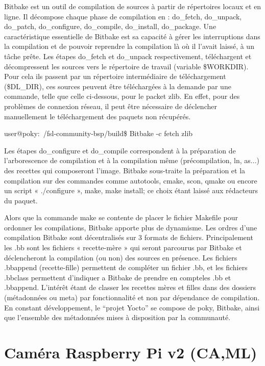Bitbake est un outil de compilation de sources à partir de répertoires locaux et en ligne. Il
décompose chaque phase de compilation en : do\_fetch, do\_unpack, do\_patch,
do\_configure, do\_compile, do\_install, do\_package. Une caractéristique essentielle de
Bitbake est sa capacité à gérer les interruptions dans la compilation et de pouvoir
reprendre la compilation là où il l'avait laissé, à un tâche prête.
Les étapes do\_fetch et do\_unpack respectivement, téléchargent et décompressent les
sources vers le répertoire de travail (variable \$WORKDIR). Pour cela ils passent par un
répertoire intermédiaire de téléchargement (\$DL\_DIR), ces sources peuvent être
téléchargées à la demande par une commande, telle que celle ci-dessous, pour le packet
zlib. En effet, pour des problèmes de connexion réseau, il peut être nécessaire de
déclencher manuellement le téléchargement des paquets non récupérés.

\begin{tcolorbox}
    user@poky:~/fsl-community-bsp/build\$ Bitbake -c fetch zlib
\end{tcolorbox}

Les étapes do\_configure et do\_compile correspondent à la préparation de l'arborescence
de compilation et à la compilation même (précompilation, ln, as...)
des recettes qui composeront l’image. Bitbake sous-traite la préparation et la
compilation sur des commandes comme autotools, cmake, scon, qmake ou encore un
script « ./configure », make, make install; ce choix étant laissé aux rédacteurs du paquet.

Alors que la commande make se contente de placer le fichier Makefile pour ordonner les
compilations, Bitbake apporte plus de dynamisme. Les ordres d’une compilation Bitbake
sont décentralisés sur 3 formats de fichiers. Principalement les .bb sont les fichiers «
recette-mère » qui seront parcourus par Bitbake et déclencheront la compilation (ou non)
des sources en présence. Les fichiers .bbappend (recette-fille) permettent de compléter un
fichier .bb, et les fichiers .bbclass permettent d’indiquer a Bitbake de prendre en compteles
.bb et .bbappend. L'intérêt étant de classer les recettes mères et filles dans des
dossiers (métadonnées ou meta) par fonctionnalité et non par dépendance de compilation.
En constant développement, le “projet Yocto” se compose de poky, Bitbake, ainsi que
l’ensemble des métadonnées mises à disposition par la communauté.

\section{Caméra Raspberry Pi v2 (CA,ML)}

